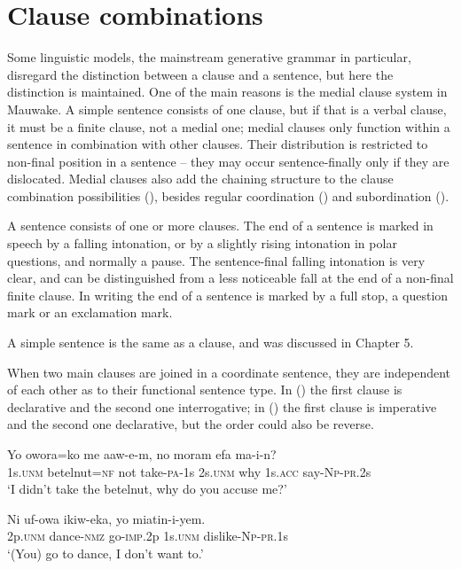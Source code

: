 
\chapter{Clause combinations}

Some linguistic models, the mainstream generative grammar in particular, disregard the distinction between a clause and a sentence, but here the distinction is maintained. One of the main reasons is the medial clause system in Mauwake.  A simple sentence consists of one clause, but if that is a verbal clause, it must be a finite clause, not a medial one; medial clauses only function within a sentence in combination with other clauses. Their distribution is restricted to non-final position in a sentence -- they may occur sentence-finally only if they are dislocated. Medial clauses also add the chaining structure to the clause combination possibilities (), besides regular coordination () and subordination (). 

A sentence consists of one or more clauses. The end of a sentence is marked in speech by a falling intonation, or by a slightly rising intonation in polar questions, and normally a pause. The sentence-final falling intonation is very clear, and can be distinguished from a less noticeable fall at the end of a non-final finite clause. In writing the end of a sentence is marked by a full stop, a question mark or an exclamation mark.

A simple sentence is the same as a clause, and was discussed in Chapter 5.

When two main clauses are joined in a coordinate sentence, they are independent of each other as to their functional sentence type. In () the first clause is declarative and the second one interrogative; in () the first clause is imperative and the second one declarative, but the order could also be reverse. 

\ea%
\label{ex:x1352}
\gll Yo  owora=ko  me  aaw-e-m,  no  moram  efa ma-i-n?\\
1s.\textsc{unm}  betelnut=\textsc{nf}  not  take-\textsc{pa}-1s  2s.\textsc{unm}  why  1s.\textsc{acc} say-\textsc{Np}-\textsc{pr}.2s\\
\glt `I didn't take the betelnut, why do you accuse me?'
\z


\ea%
\label{ex:x1358}
\gll Ni  uf-owa  ikiw-eka,  yo  miatin-i-yem. \\
2p.\textsc{unm}  dance-\textsc{nmz}  go-\textsc{imp}.2p  1s.\textsc{unm}  dislike-\textsc{Np}-\textsc{pr}.1s\\
\glt `(You) go to dance, I don't want to.'
\z

